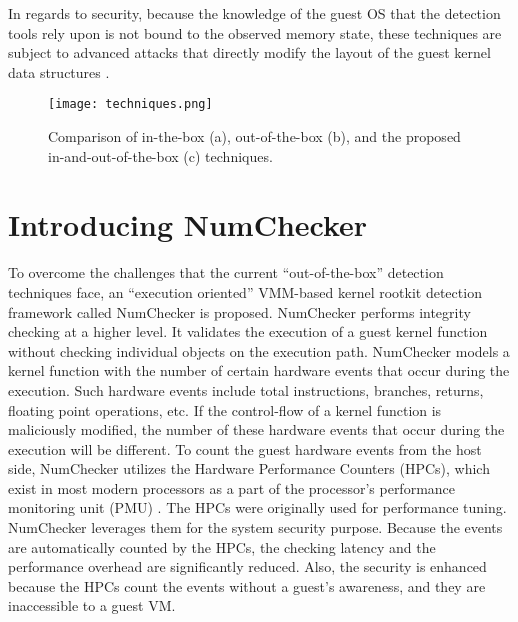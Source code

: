 \documentclass[12pt]{report}
\begin{document}
In regards to security, because the knowledge of the guest
OS that the detection tools rely upon is not bound to the observed
memory state, these techniques are subject to advanced
attacks that directly modify the layout of the guest kernel data
structures .

\begin{figure}[h]
\centering
\texttt{[image: techniques.png]}
\caption{Comparison of in-the-box (a), out-of-the-box (b), and the
proposed in-and-out-of-the-box (c) techniques.}
\label{fig:lion}
\end{figure}

\section{Introducing NumChecker}

To overcome the challenges that the current “out-of-the-box”
detection techniques face,  an “execution oriented”
VMM-based kernel rootkit detection framework
called NumChecker is proposed. NumChecker performs integrity checking
at a higher level. It validates the execution of a guest kernel
function without checking individual objects on the execution
path. NumChecker models a kernel function with the
number of certain hardware events that occur during the
execution. Such hardware events include total instructions,
branches, returns, floating point operations, etc. If the
control-flow of a kernel function is maliciously modified,
the number of these hardware events that occur during the
execution will be different.
To count the guest hardware events from the host side,
NumChecker utilizes the Hardware Performance Counters
(HPCs), which exist in most modern processors as a part of
the processor’s performance monitoring unit (PMU) .
The HPCs were originally used for performance tuning.
NumChecker leverages them for the system security purpose.
Because the events are automatically counted by the
HPCs, the checking latency and the performance overhead are
significantly reduced. Also, the security is enhanced because
the HPCs count the events without a guest’s awareness, and
they are inaccessible to a guest VM.
\end{document}
